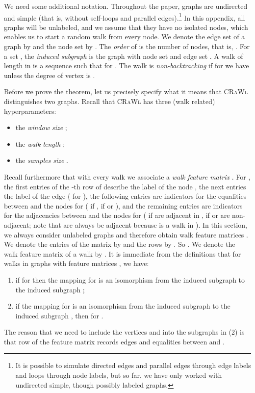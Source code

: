\documentclass{scrartcl} \usepackage[dvipsnames]{xcolor}
\newcommand{\crawl}{\textsc{CRaWl}}
\begin{document}
We need some additional notation. Throughout the paper, graphs are 
undirected and simple (that is, without self-loops and parallel edges).\footnote{It is possible to simulate directed edges and parallel edges through edge labels and loops through node labels, but so far, we have only worked with undirected simple, though possibly labeled graphs.}
In this appendix, all graphs will be unlabeled, and we assume that they have no isolated nodes, which enables us to
start a random walk from every node. We denote the edge set of a
graph  by  and the node set by . The \emph{order}
 of  is the number of nodes, that is,
.
For a set , the
\emph{induced subgraph}  is the graph with node set  and
edge set .
A walk of length  in  is a sequence
 such that  for . The walk is \emph{non-backtracking}
if for  we have
 unless the degree of vertex  is .








Before we prove the theorem, let us precisely specify what it means that \crawl{}
distinguishes two graphs. Recall that \crawl{} has three (walk related) hyperparameters:
\begin{itemize}
\item the \emph{window size} ;
\item the \emph{walk length} ;
\item the \emph{samples size} .
\end{itemize}
Recall furthermore that with every walk  we associate a
\emph{walk feature matrix} . For
, the first  entries of the -th row of 
describe the label of the node , the next  entries the
label of the edge  ( for ), the following 
entries are indicators for the equalities between  and the
nodes  for  ( if ,  if
 or ), and the remaining  entries are
indicators for the adjacencies between  and the nodes
 for  ( if  are adjacent in ,
 if  or  are non-adjacent; note that
 are always be adjacent because  is a walk in ). In
this section, we always consider unlabeled graphs and therefore
obtain walk feature matrices . We
denote the entries of the matrix  by  and the rows by
. So .
We denote the walk feature matrix of a walk  by . It is
immediate from the definitions that for walks
 in graphs  with
feature matrices , we have:
\begin{enumerate}
  \item
  if  for  then the mapping  for
 is an isomorphism from the induced subgraph
 to the induced subgraph
;
\item 
if the mapping  for
 is an isomorphism from the induced subgraph
 to the induced subgraph
, then  for .
\end{enumerate}
The reason that we need to include the vertices
 and  into the subgraphs in (2) is that row  of the feature matrix records edges
and equalities between  and .
\end{document}
